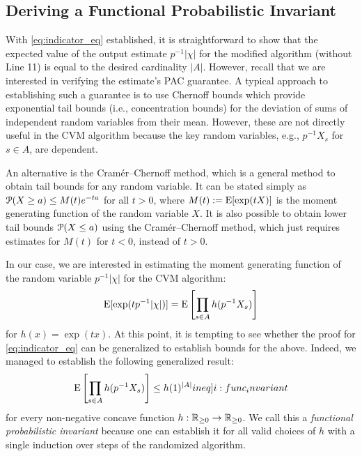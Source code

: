 \subsection{Deriving a Functional Probabilistic Invariant}
With \cref{eq:indicator_eq} established, it is straightforward to show that the expected value of the output estimate $p^{-1} |\chi|$ for the modified algorithm (without Line 11) is equal to the desired cardinality $|A|$.
However, recall that we are interested in verifying the estimate's PAC guarantee.
A typical approach to establishing such a guarantee is to use Chernoff bounds which provide exponential tail bounds (i.e., concentration bounds) for the deviation of sums of independent random variables from their mean.
However, these are not directly useful in the CVM algorithm because the key random variables, e.g., $p^{-1} X_s$ for $s \in A$, are dependent.

An alternative is the Cram\'{e}r--Chernoff method, which is a general method to obtain tail bounds for any random variable.
It can be stated simply as $\operatorname{\mathcal P}(X \geq a) \leq M(t) e^{-ta}$ for all $t > 0$, where $M(t) := \operatorname{\mathrm{E}} [\exp(t X)]$ is the moment generating function of the random variable $X$.
It is also possible to obtain lower tail bounds $\operatorname{\mathcal P}(X \leq a)$ using the Cram\'{e}r--Chernoff method, which just requires estimates for $M(t)$ for $t < 0$, instead of $t > 0$.

In our case, we are interested in estimating the moment generating function of the random variable $p^{-1} |\chi|$ for the CVM algorithm:
\[
  \operatorname{\mathrm{E}} [\exp( t p^{-1} |\chi| )] = \operatorname{\mathrm{E}} \left[ \prod_{s \in A} h(p^{-1} X_s) \right]
\]
for $h(x) = \exp(tx)$.
At this point, it is tempting to see whether the proof for \cref{eq:indicator_eq} can be generalized to establish bounds for the above.
Indeed, we managed to establish the following generalized result:
\begin{align}
  \expect \left[ \prod_{s \in A} h(p^{-1} X_s) \right] \leq h(1)^{|A|} \label[ineq]{i:func_invariant}
\end{align}
for every non-negative concave function $h : \operatorname{\mathbb R_{\geq 0}} \rightarrow \operatorname{\mathbb R_{\geq 0}}$.
We call this a \emph{functional probabilistic invariant} because one can establish it for all valid choices of $h$ with a single induction over steps of the randomized algorithm.

